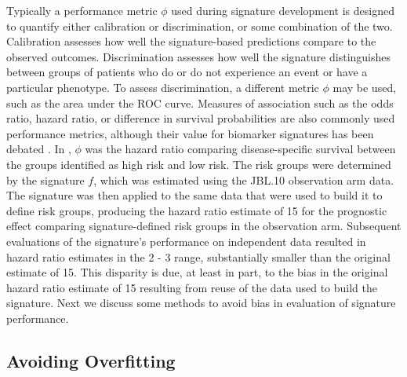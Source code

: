 \documentclass[11pt,]{article}
\begin{document}
Typically a performance metric \(\phi\) used during signature
development is designed to quantify either calibration or
discrimination, or some combination of the two. Calibration assesses how
well the signature-based predictions compare to the observed outcomes.
Discrimination assesses how well the signature distinguishes between
groups of patients who do or do not experience an event or have a
particular phenotype. To assess discrimination, a different metric
\(\phi\) may be used, such as the area under the ROC curve. Measures of
association such as the odds ratio, hazard ratio, or difference in
survival probabilities are also commonly used performance metrics,
although their value for biomarker signatures has been debated
\citep{pepe2004limitations}. In \citet{zhu2010prognostic}, \(\phi\) was
the hazard ratio comparing disease-specific survival between the groups
identified as high risk and low risk. The risk groups were determined by
the signature \(f\), which was estimated using the JBL.10 observation
arm data. The signature was then applied to the same data that were used
to build it to define risk groups, producing the hazard ratio estimate
of 15 for the prognostic effect comparing signature-defined risk groups
in the observation arm. Subsequent evaluations of the signature's
performance on independent data resulted in hazard ratio estimates in
the 2 - 3 range, substantially smaller than the original estimate of 15.
This disparity is due, at least in part, to the bias in the original
hazard ratio estimate of 15 resulting from reuse of the data used to
build the signature. Next we discuss some methods to avoid bias in
evaluation of signature performance.

\subsection{Avoiding Overfitting}\label{avoiding-overfitting}
\end{document}
